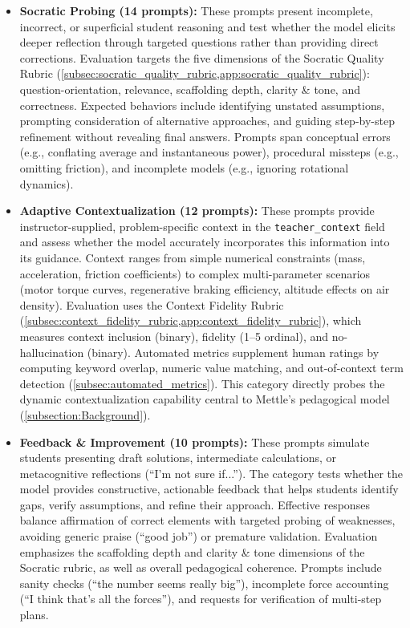 \begin{itemize}[leftmargin=*]
    \item \textbf{Socratic Probing (14 prompts):} These prompts present incomplete, incorrect, or superficial student reasoning and test whether the model elicits deeper reflection through targeted questions rather than providing direct corrections. Evaluation targets the five dimensions of the Socratic Quality Rubric (\cref{subsec:socratic_quality_rubric,app:socratic_quality_rubric}): question-orientation, relevance, scaffolding depth, clarity \& tone, and correctness. Expected behaviors include identifying unstated assumptions, prompting consideration of alternative approaches, and guiding step-by-step refinement without revealing final answers. Prompts span conceptual errors (e.g., conflating average and instantaneous power), procedural missteps (e.g., omitting friction), and incomplete models (e.g., ignoring rotational dynamics).

    \item \textbf{Adaptive Contextualization (12 prompts):} These prompts provide instructor-supplied, problem-specific context in the \texttt{teacher\_context} field and assess whether the model accurately incorporates this information into its guidance. Context ranges from simple numerical constraints (mass, acceleration, friction coefficients) to complex multi-parameter scenarios (motor torque curves, regenerative braking efficiency, altitude effects on air density). Evaluation uses the Context Fidelity Rubric (\cref{subsec:context_fidelity_rubric,app:context_fidelity_rubric}), which measures context inclusion (binary), fidelity (1--5 ordinal), and no-hallucination (binary). Automated metrics supplement human ratings by computing keyword overlap, numeric value matching, and out-of-context term detection (\cref{subsec:automated_metrics}). This category directly probes the dynamic contextualization capability central to Mettle's pedagogical model (\cref{subsection:Background}).

    \item \textbf{Feedback \& Improvement (10 prompts):} These prompts simulate students presenting draft solutions, intermediate calculations, or metacognitive reflections (``I'm not sure if...''). The category tests whether the model provides constructive, actionable feedback that helps students identify gaps, verify assumptions, and refine their approach. Effective responses balance affirmation of correct elements with targeted probing of weaknesses, avoiding generic praise (``good job'') or premature validation. Evaluation emphasizes the scaffolding depth and clarity \& tone dimensions of the Socratic rubric, as well as overall pedagogical coherence. Prompts include sanity checks (``the number seems really big''), incomplete force accounting (``I think that's all the forces''), and requests for verification of multi-step plans.


\end{itemize}
